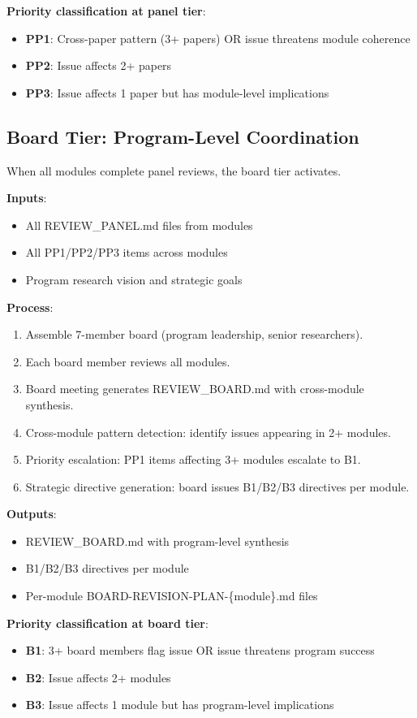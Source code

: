 \textbf{Priority classification at panel tier}:
\begin{itemize}
\item \textbf{PP1}: Cross-paper pattern (3+ papers) OR issue threatens module coherence
\item \textbf{PP2}: Issue affects 2+ papers
\item \textbf{PP3}: Issue affects 1 paper but has module-level implications
\end{itemize}

\subsection{Board Tier: Program-Level Coordination}

When all modules complete panel reviews, the board tier activates.

\textbf{Inputs}:
\begin{itemize}
\item All REVIEW\_PANEL.md files from modules
\item All PP1/PP2/PP3 items across modules
\item Program research vision and strategic goals
\end{itemize}

\textbf{Process}:
\begin{enumerate}
\item Assemble 7-member board (program leadership, senior researchers).
\item Each board member reviews all modules.
\item Board meeting generates REVIEW\_BOARD.md with cross-module synthesis.
\item Cross-module pattern detection: identify issues appearing in 2+ modules.
\item Priority escalation: PP1 items affecting 3+ modules escalate to B1.
\item Strategic directive generation: board issues B1/B2/B3 directives per module.
\end{enumerate}

\textbf{Outputs}:
\begin{itemize}
\item REVIEW\_BOARD.md with program-level synthesis
\item B1/B2/B3 directives per module
\item Per-module BOARD-REVISION-PLAN-\{module\}.md files
\end{itemize}

\textbf{Priority classification at board tier}:
\begin{itemize}
\item \textbf{B1}: 3+ board members flag issue OR issue threatens program success
\item \textbf{B2}: Issue affects 2+ modules
\item \textbf{B3}: Issue affects 1 module but has program-level implications
\end{itemize}

